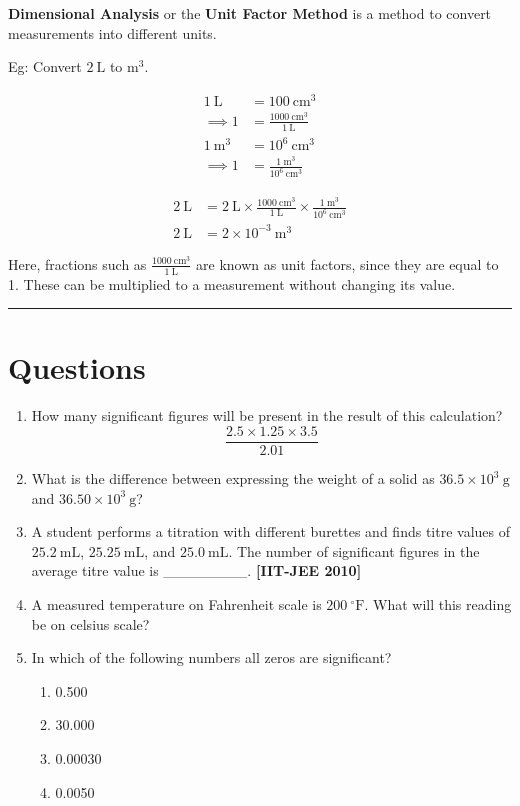 \documentclass[
  14pt,
]{extarticle}
\providecommand{\tightlist}{%
  \setlength{\itemsep}{0pt}\setlength{\parskip}{0pt}}
\begin{document}
\textbf{Dimensional Analysis} or the \textbf{Unit Factor Method} is a
method to convert measurements into different units.

Eg: Convert \({2~\mathrm{L}}\) to \({\mathrm{m^{3}}}\).

\begin{align*}
1~\mathrm{L} &= 100~\mathrm{cm^3} \\
\implies 1 &= \frac{1000~\mathrm{cm^3}}{1~\mathrm{L}} \\
1~\mathrm{m^3} &= 10^6~\mathrm{cm^3} \\
\implies 1 &= \frac{1~\mathrm{m^3}}{10^6~\mathrm{cm^3}}
\end{align*}

\begin{align*}
2~\mathrm{L} &= 2~\mathrm{L}\times \frac{1000~\mathrm{cm^3}}{1~\mathrm{L}} \times \frac{1~\mathrm{m^3}}{10^6~\mathrm{cm^3}}\\
2~\mathrm{L} &= 2\times 10^{-3}~\mathrm{m^3}
\end{align*}

Here, fractions such as \(\frac{1000~\mathrm{cm^3}}{1~\mathrm{L}}\) are
known as unit factors, since they are equal to 1. These can be
multiplied to a measurement without changing its value.

\begin{center}\rule{0.5\linewidth}{0.5pt}\end{center}

\hypertarget{questions}{%
\section{Questions}\label{questions}}

\begin{enumerate}
\def\labelenumi{\arabic{enumi}.}
\item
  How many significant figures will be present in the result of this
  calculation? \[\frac{2.5\times 1.25\times 3.5}{2.01}\]
\item
  What is the difference between expressing the weight of a solid as
  \({36.5\times 10^{3}~\mathrm{g}}\) and
  \({36.50\times 10^{3}~\mathrm{g}}\)?
\item
  A student performs a titration with different burettes and finds titre
  values of \({25.2~\mathrm{mL}}\), \({25.25~\mathrm{mL}}\), and
  \({25.0~\mathrm{mL}}\). The number of significant figures in the
  average titre value is \_\_\_\_\_\_\_\_. \textbf{{[}IIT-JEE 2010{]}}
\item
  A measured temperature on Fahrenheit scale is
  \({200~\mathrm{{}^{\circ}F}}\). What will this reading be on celsius
  scale?
\item
  In which of the following numbers all zeros are significant?

  \begin{enumerate}
  \def\labelenumii{(\Alph{enumii})}
  \tightlist
  \item
    0.500
  \item
    30.000
  \item
    0.00030
  \item
    0.0050
  \end{enumerate}
\end{enumerate}
\end{document}
